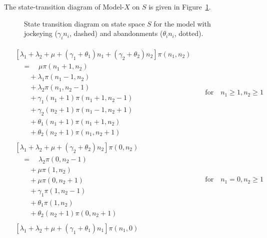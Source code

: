 The state-transition diagram of Model-$X$ on $S$ is given in Figure~\ref{fig:diagram-gen}.
\begin{figure}[H]
  \centering
  \resizebox{0.8\textwidth}{!}{%
    
  }
  \caption{State transition diagram on state space $S$ for the model with jockeying ($\gamma_i n_i$, dashed) and abandonments ($\theta_i n_i$, dotted).}
  \label{fig:diagram-gen}
\end{figure}

\begin{align}
    \begin{split}
        &\left[\lambda_1 + \lambda_2 + \mu + (\gamma_1 + \theta_1) n_1 + (\gamma_2 + \theta_2) n_2\right] \pi(n_1,n_2) \\
        & \quad = \quad \mu \pi(n_1+1,n_2) \\
        & \quad \quad + \lambda_1 \pi(n_1-1,n_2) \\
        & \quad \quad + \lambda_2 \pi(n_1,n_2-1) \\
        & \quad \quad + \gamma_1 (n_1+1) \pi(n_1+1,n_2-1) \\
        & \quad \quad + \gamma_2 (n_2+1) \pi(n_1-1,n_2+1) \\
        & \quad \quad + \theta_1 (n_1+1) \pi(n_1+1,n_2) \\
        & \quad \quad + \theta_2 (n_2+1) \pi(n_1,n_2+1)
    \end{split}
    && \text{for} \quad n_1 \geq 1, n_2 \geq 1 \label{eq:gen:balance_interior}\\
    \begin{split}
        & \left[ \lambda_1 + \lambda_2 + \mu +  (\gamma_2 + \theta_2) n_2 \right] \pi(0,n_2) \\
        & \quad = \quad \lambda_2 \pi(0,n_2-1) \\
        & \quad \quad + \mu \pi(1,n_2) \\
        & \quad \quad + \mu \pi(0,n_2+1) \\
        & \quad \quad + \gamma_1 \pi(1, n_2-1) \\
        & \quad \quad + \theta_1 \pi(1, n_2) \\
        & \quad \quad + \theta_2(n_2+1) \pi(0,n_2+1)
    \end{split}
    && \text{for} \quad n_1=0, n_2 \geq 1 \label{eq:gen:balance_y_boundary}\\
    \begin{split}
        & \left[ \lambda_1 + \lambda_2 + \mu + (\gamma_1 + \theta_1) n_1 \right] \pi(n_1,0) \\

\end{split}
\end{align}
